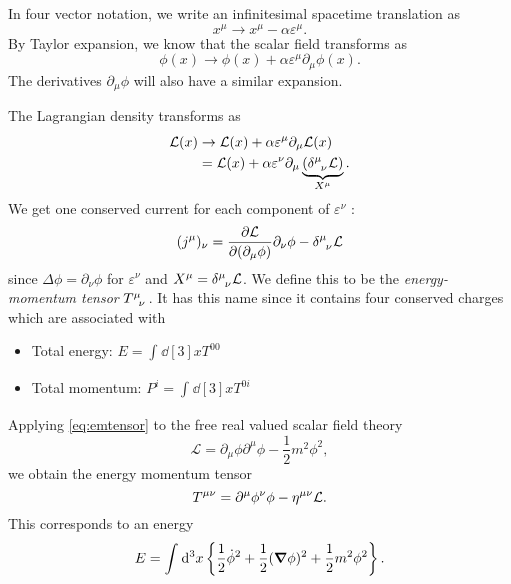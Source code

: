 
\begin{example}
In four vector notation, we write an infinitesimal spacetime translation as 
\begin{equation}
  x^\mu \to x^\mu - \alpha \varepsilon^\mu.
\end{equation}
By Taylor expansion, we know that the scalar field transforms as
\begin{equation}
  \phi(x) \to \phi(x) + \alpha \varepsilon^\mu \partial_\mu \phi(x).
\end{equation}
The derivatives $\partial_\mu \phi$ will also have a similar expansion.

The Lagrangian density transforms as
\begin{align}
  \mathcal{L}(x) &\to \mathcal{L}(x) + \alpha \varepsilon^\mu \partial_\mu \mathcal{L}(x) \\
  &= \mathcal{L}(x) + \alpha \varepsilon^\nu \partial_\mu \underbrace{(\delta \indices{^\mu_\nu} \mathcal{L})}_{X^\mu}.
\end{align}
We get one conserved current for each component of $\varepsilon^\nu$ :
\begin{equation}
  \label{eq:emtensor}
  (j^\mu)_\nu = \pdv{\mathcal{L}}{(\partial_\mu \phi)} \partial_\nu \phi - \delta \indices{^\mu_\nu} \mathcal{L}
\end{equation}
since $\Delta \phi = \partial_\nu \phi$ for $ \varepsilon^\nu$ and $X^\mu = \delta \indices{^\mu_\nu} \mathcal{L}$.
  We define this to be the \emph{energy-momentum tensor} $T \indices{^\mu _\nu}$. It has this name since it contains four conserved charges which are associated with
  \begin{itemize}
    \item Total energy: $E = \int_{}^{} \dd[3]{x} T^{00}$
    \item Total momentum: $P^i = \int_{}^{} \dd[3]{x} T^{0i}$
  \end{itemize}

  Applying \eqref{eq:emtensor} to the free real valued scalar field theory
  \begin{equation}
    \mathcal{L} =  \partial_\mu \phi \partial^\mu \phi - \frac{1}{2} m^2 \phi^2,
  \end{equation}
  we obtain the energy momentum tensor
  \begin{equation}
    T \indices{^\mu^\nu} = \partial^\mu \phi ^\nu \phi - \eta\indices{^\mu^\nu} \mathcal{L}.
  \end{equation}
  This corresponds to an energy
  \begin{equation}
    E = \int_{}^{} \dd[3]{x}\left\{ \frac{1}{2} \dot \phi^2 + \frac{1}{2} (\grad \phi)^2 + \frac{1}{2} m^2 \phi^2 \right\}.
  \end{equation}
\end{example}

